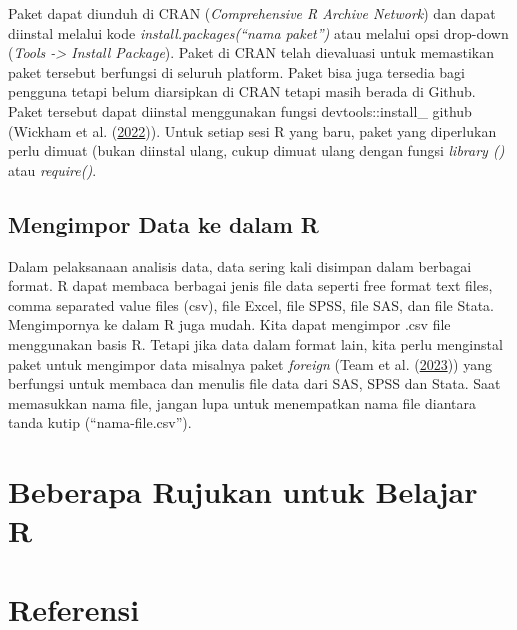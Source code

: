 \documentclass[a4paper, nobind]{templates/ociamthesis}
\begin{document}
Paket dapat diunduh di CRAN (\emph{Comprehensive R Archive Network}) dan dapat diinstal melalui kode \emph{install.packages(``nama paket'')} atau melalui opsi drop-down (\emph{Tools -\textgreater{} Install Package}). Paket di CRAN telah dievaluasi untuk memastikan paket tersebut berfungsi di seluruh platform. Paket bisa juga tersedia bagi pengguna tetapi belum diarsipkan di CRAN tetapi masih berada di Github. Paket tersebut dapat diinstal menggunakan fungsi devtools::install\_ github (Wickham et al. (\protect\hyperlink{ref-wickhamDevtoolsToolsMake2022}{2022})). Untuk setiap sesi R yang baru, paket yang diperlukan perlu dimuat (bukan diinstal ulang, cukup dimuat ulang dengan fungsi \emph{library ()} atau \emph{require()}.

\hypertarget{mengimpor-data-ke-dalam-r}{%
\section{Mengimpor Data ke dalam R}\label{mengimpor-data-ke-dalam-r}}

Dalam pelaksanaan analisis data, data sering kali disimpan dalam berbagai format. R dapat membaca berbagai jenis file data seperti free format text files, comma separated value ﬁles (csv), file Excel, file SPSS, file SAS, dan file Stata. Mengimpornya ke dalam R juga mudah. Kita dapat mengimpor .csv file menggunakan basis R. Tetapi jika data dalam format lain, kita perlu menginstal paket untuk mengimpor data misalnya paket \emph{foreign} (Team et al. (\protect\hyperlink{ref-rcoreteamForeignReadData2023}{2023})) yang berfungsi untuk membaca dan menulis file data dari SAS, SPSS dan Stata. Saat memasukkan nama file, jangan lupa untuk menempatkan nama file diantara tanda kutip (``nama-file.csv'').

\startappendices

\hypertarget{beberapa-rujukan-untuk-belajar-r}{%
\chapter{Beberapa Rujukan untuk Belajar R}\label{beberapa-rujukan-untuk-belajar-r}}

\hypertarget{referensi}{%
\chapter*{Referensi}\label{referensi}}

\end{document}
